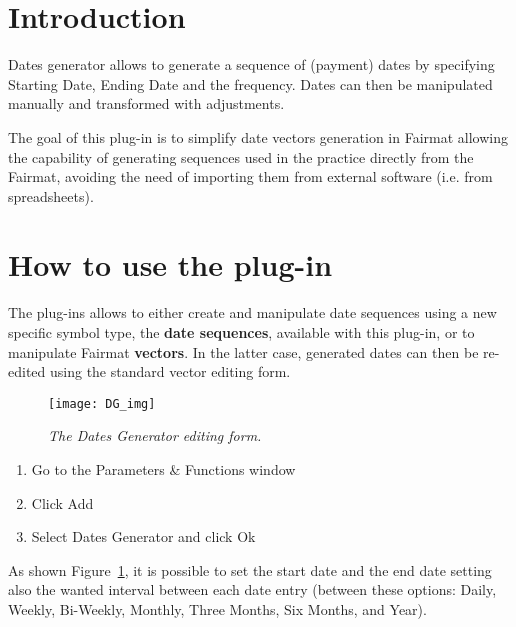 \newcommand{\pluginName}{Dates Generator}
\newcommand{\pluginVersion}{1.0}





\PluginTitle{\pluginName}{\pluginVersion}

\section{Introduction}
Dates generator allows to generate a sequence of (payment) dates by specifying Starting Date, Ending Date and the frequency. Dates can then be manipulated manually and transformed with adjustments.

The goal of this plug-in is to simplify date vectors generation in Fairmat allowing the capability of generating sequences used in the practice directly from the Fairmat, avoiding the 
need of importing them from external software (i.e. from spreadsheets).

\section{How to use the plug-in}
The plug-ins allows to either create and manipulate date sequences using a new specific symbol type, the \textbf{date sequences}, available with this plug-in, or to manipulate Fairmat \textbf{vectors}. In the latter case, generated dates can then be re-edited using the standard vector editing form.

\begin{figure}[htbp]
\texttt{[image: DG\_img]}
\centering
\caption{\small{\emph{The Dates Generator editing form.}}}
\label{fig:DG}
\end{figure}

\begin{enumerate}
\item Go to the Parameters \& Functions window
\item Click Add
\item Select Dates Generator and click Ok
\end{enumerate}
As shown Figure~\ref{fig:DG}, it is possible to set the start date and the end date setting also the wanted interval between each date entry (between these options: Daily, Weekly, Bi-Weekly, Monthly, Three Months, Six Months, and Year).




